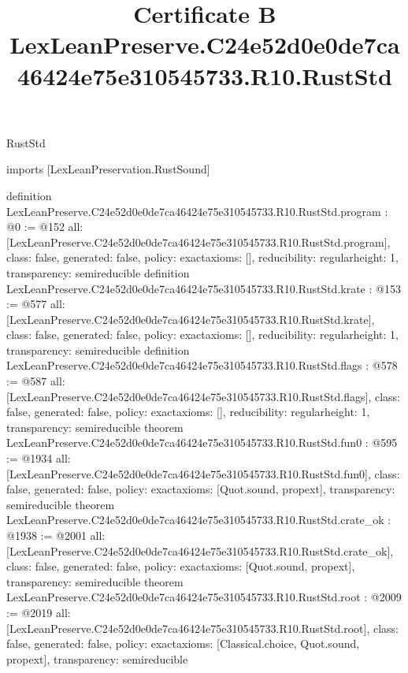 \begin{lexlean}{RustStd}
\title{Certificate B LexLeanPreserve.C24e52d0e0de7ca46424e75e310545733.R10.RustStd}
\begin{coremodule}
imports [LexLeanPreservation.RustSound]

definition LexLeanPreserve.C24e52d0e0de7ca46424e75e310545733.R10.RustStd.program : @0 := @152 {
  all: [LexLeanPreserve.C24e52d0e0de7ca46424e75e310545733.R10.RustStd.program],
  class: false,
  generated: false,
  policy: exact{axioms: []},
  reducibility: regular{height: 1},
  transparency: semireducible
}
definition LexLeanPreserve.C24e52d0e0de7ca46424e75e310545733.R10.RustStd.krate : @153 := @577 {
  all: [LexLeanPreserve.C24e52d0e0de7ca46424e75e310545733.R10.RustStd.krate],
  class: false,
  generated: false,
  policy: exact{axioms: []},
  reducibility: regular{height: 1},
  transparency: semireducible
}
definition LexLeanPreserve.C24e52d0e0de7ca46424e75e310545733.R10.RustStd.flags : @578 := @587 {
  all: [LexLeanPreserve.C24e52d0e0de7ca46424e75e310545733.R10.RustStd.flags],
  class: false,
  generated: false,
  policy: exact{axioms: []},
  reducibility: regular{height: 1},
  transparency: semireducible
}
theorem LexLeanPreserve.C24e52d0e0de7ca46424e75e310545733.R10.RustStd.fun0 : @595 := @1934 {
  all: [LexLeanPreserve.C24e52d0e0de7ca46424e75e310545733.R10.RustStd.fun0],
  class: false,
  generated: false,
  policy: exact{axioms: [Quot.sound, propext]},
  transparency: semireducible
}
theorem LexLeanPreserve.C24e52d0e0de7ca46424e75e310545733.R10.RustStd.crate_ok : @1938 := @2001 {
  all: [LexLeanPreserve.C24e52d0e0de7ca46424e75e310545733.R10.RustStd.crate_ok],
  class: false,
  generated: false,
  policy: exact{axioms: [Quot.sound, propext]},
  transparency: semireducible
}
theorem LexLeanPreserve.C24e52d0e0de7ca46424e75e310545733.R10.RustStd.root : @2009 := @2019 {
  all: [LexLeanPreserve.C24e52d0e0de7ca46424e75e310545733.R10.RustStd.root],
  class: false,
  generated: false,
  policy: exact{axioms: [Classical.choice, Quot.sound, propext]},
  transparency: semireducible
}


\end{coremodule}
\end{lexlean}

